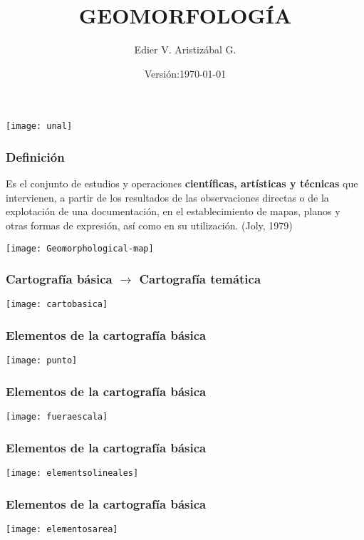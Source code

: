 \documentclass{beamer}
\title[Cartografía Geomorfológica]{GEOMORFOLOGÍA}
\author[Edier Aristizabal]{Edier V. Aristizábal G.}
\institute{evaristizabalg@unal.edu.co}
\date{\tiny{Versión:\today}}
\begin{document}
\begin{frame}
\titlepage
\centering
   	\texttt{[image: unal]} 
\end{frame}
\begin{frame}
\frametitle{Definición}
\small{Es el conjunto de estudios y operaciones \textbf{científicas, artísticas y técnicas} que intervienen, a partir de los resultados de las observaciones directas o de la explotación de una documentación, en el establecimiento de mapas, planos y otras formas de expresión, así como en su utilización. (Joly, 1979) }

\begin{center}
   	\texttt{[image: Geomorphological-map]}
\end{center}
\end{frame}
\begin{frame}
\frametitle{Cartografía básica $\rightarrow$ Cartografía temática}
\begin{center}
   	\texttt{[image: cartobasica]}
\end{center}
\end{frame}
\begin{frame}
\frametitle{Elementos de la cartografía básica}
\begin{center}
   	\texttt{[image: punto]}
\end{center}
\end{frame}
\begin{frame}
\frametitle{Elementos de la cartografía básica}
\begin{center}
   	\texttt{[image: fueraescala]}
\end{center}
\end{frame}
\begin{frame}
\frametitle{Elementos de la cartografía básica}
\begin{center}
   	\texttt{[image: elementsolineales]}
\end{center}
\end{frame}
\begin{frame}
\frametitle{Elementos de la cartografía básica}
\begin{center}
   	\texttt{[image: elementosarea]}
\end{center}
\end{frame}
\end{document}
